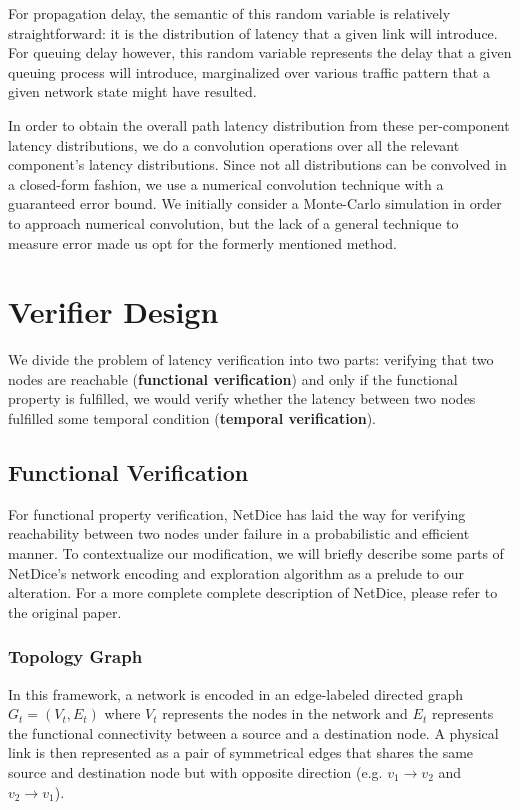 \documentclass[10pt,sigconf,letterpaper,anonymous,nonacm]{acmart}
\begin{document}
For propagation delay, the semantic of this random variable is relatively straightforward: it is 
the distribution of latency that a given link will introduce.
For queuing delay however, this random variable represents the delay that a given queuing process 
will introduce, marginalized over various traffic pattern that a given network state might have 
resulted.

In order to obtain the overall path latency distribution from these per-component latency 
distributions, we do a convolution operations over all the relevant component's latency 
distributions.
Since not all distributions can be convolved in a closed-form fashion, we use a numerical 
convolution technique with a guaranteed error bound. 
We initially consider a Monte-Carlo simulation in order to approach numerical convolution, but 
the lack of a general technique to measure error made us opt for the formerly mentioned method.


\section{Verifier Design}
We divide the problem of latency verification into two parts: 
verifying that two nodes are reachable (\textbf{functional verification}) and only if 
the functional property is fulfilled, we would verify whether the latency between 
two nodes fulfilled some temporal condition (\textbf{temporal verification}).

\subsection{Functional Verification}
For functional property verification, NetDice \cite{steffen2020probabilistic} 
has laid the way for verifying reachability between two nodes under failure in a 
probabilistic and efficient manner.
To contextualize our modification, we will briefly describe some parts of 
NetDice's network encoding and exploration algorithm as a prelude to our alteration.
For a more complete complete description of NetDice, please refer to the original 
paper.

\subsubsection{Topology Graph}
In this framework, a network is encoded in an edge-labeled directed graph 
$G_t = (V_t, E_t)$ where $V_t$ represents the nodes in the network and 
$E_t$ represents the functional connectivity between a source and a destination node. 
A physical link is then represented as a pair of symmetrical edges that shares the same source 
and destination node but with opposite direction (e.g. $v_1 \rightarrow v_2$ and $v_2 
\rightarrow v_1$).
\end{document}
